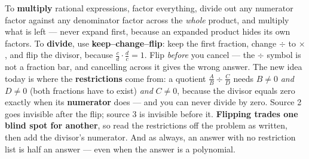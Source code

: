\documentclass[10pt]{article}
\begin{document}
\vspace{0.10in}

\begin{remindbox}
\small To \textbf{multiply} rational expressions, factor everything, divide out any numerator factor
against any denominator factor across the \emph{whole} product, and multiply what is left --- never
expand first, because an expanded product hides its own factors. To \textbf{divide}, use
\textbf{keep--change--flip}: keep the first fraction, change $\div$ to $\times$, and flip the divisor,
because $\frac cd\cdot\frac dc=1$. Flip \emph{before} you cancel --- the $\div$ symbol is not a
fraction bar, and cancelling across it gives the wrong answer. The new idea today is where the
\textbf{restrictions} come from: a quotient $\frac AB\div\frac CD$ needs $B\neq0$ \emph{and} $D\neq0$
(both fractions have to exist) \emph{and} $C\neq0$, because the divisor equals zero exactly when its
\textbf{numerator} does --- and you can never divide by zero. Source 2 goes invisible after the flip;
source 3 is invisible before it. \textbf{Flipping trades one blind spot for another}, so read the
restrictions off the problem as written, then add the divisor's numerator. And as always, an answer
with no restriction list is half an answer --- even when the answer is a polynomial.
\end{remindbox}
\end{document}
